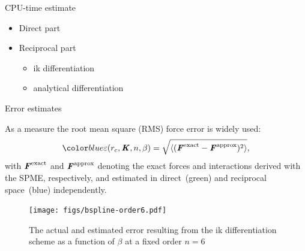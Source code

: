 \documentclass[final,hyperref={pdfpagelabels=false}]{beamer}
\begin{document}
\begin{frame}{}
\begin{columns}[t]
\begin{column}{.32\linewidth}
        \begin{block}{\large CPU-time estimate}
          \vspace{1ex}
          \begin{minipage}[c]{.975\linewidth}
          \begin{itemize}
          \item Direct part \quad {}
          \item Reciprocal part 
            \begin{itemize}
            \item ik differentiation \newline
            \item analytical differentiation\newline
            \end{itemize}
          \end{itemize}
        \end{minipage}
        \end{block}
        \vfill
        \begin{block}{\large Error estimates}
          \vspace{1ex}
          \begin{minipage}[c]{.975\linewidth}
          As a measure the root mean square (RMS) force error is widely used:
          $$ \bluec{\varepsilon(r_c, \v K,
            n, \beta) = \sqrt{\langle(\v F^{\textrm{exact}} - \v
              F^{\textrm{{approx}}})^2\rangle} },$$
          with $\textbf{\textit{F}}^{\textrm{exact}}$ and $\textbf{\textit{F}}^{\textrm{approx}}$ denoting the
          exact forces and interactions derived with the SPME,
          respectively, and estimated in direct~(green) and
          reciprocal space~(blue) independently.
          \vspace{-1ex}
          \begin{figure}
            \texttt{[image: figs/bspline-order6.pdf]}
          \vspace{-1ex}
            \caption{The actual and estimated error resulting from the ik
              differentiation scheme as a function of $\beta$ at a fixed order
              $n=6$ }
          \end{figure}

\end{minipage}
\end{block}
\end{column}
\end{columns}
\end{frame}
\end{document}
